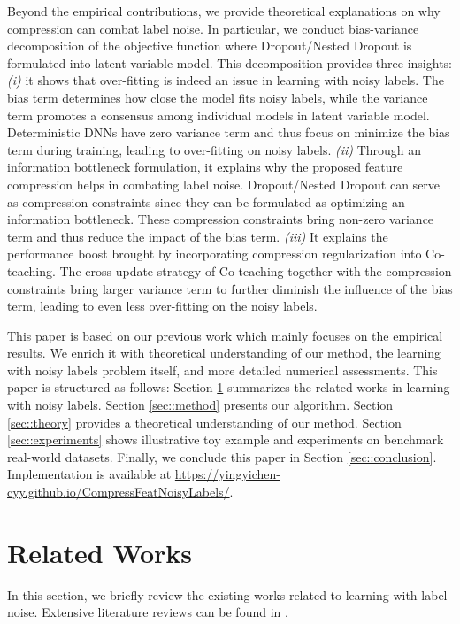 \documentclass[journal]{IEEEtran}
\begin{document}
Beyond the empirical contributions, we provide theoretical explanations on why compression can combat label noise.
In particular, we conduct bias-variance decomposition of the objective function where Dropout/Nested Dropout is formulated into latent variable model.
This decomposition provides three insights:
\textit{(i)} it shows that over-fitting is indeed an issue in learning with noisy labels.
The bias term determines how close the model fits noisy labels, while the variance term promotes a consensus among individual models in latent variable model.
Deterministic DNNs have zero variance term and thus focus on minimize the bias term during training, leading to over-fitting on noisy labels.
\textit{(ii)} Through an information bottleneck formulation, it explains why the proposed feature compression helps in combating label noise.
Dropout/Nested Dropout can serve as compression constraints since they can be formulated as optimizing an information bottleneck.
These compression constraints bring non-zero variance term and thus reduce the impact of the bias term.
\textit{(iii)} It explains the performance boost brought by incorporating compression regularization into Co-teaching.
The cross-update strategy of Co-teaching together with the compression constraints bring larger variance term to further diminish the influence of the bias term, leading to even less over-fitting on the noisy labels.

This paper is based on our previous work \cite{chen2021boosting} which mainly focuses on the empirical results.
We enrich it with theoretical understanding of our method, the learning with noisy labels problem itself, and more detailed numerical assessments.
This paper is structured as follows: 
Section \ref{sec::relatedWork} summarizes the related works in learning with noisy labels.
Section \ref{sec::method} presents our algorithm.
Section \ref{sec::theory} provides a theoretical understanding of our method.
Section \ref{sec::experiments} shows illustrative toy example and experiments on benchmark real-world datasets. 
Finally, we conclude this paper in Section \ref{sec::conclusion}. 
Implementation is available at \href{https://yingyichen-cyy.github.io/CompressFeatNoisyLabels/}{https://yingyichen-cyy.github.io/CompressFeatNoisyLabels/}.

\section{Related Works} \label{sec::relatedWork}
In this section, we briefly review the existing works related to learning with label noise.
Extensive literature reviews can be found in \cite{song2020learning,han2020survey,cordeiro2020survey}.
\end{document}
